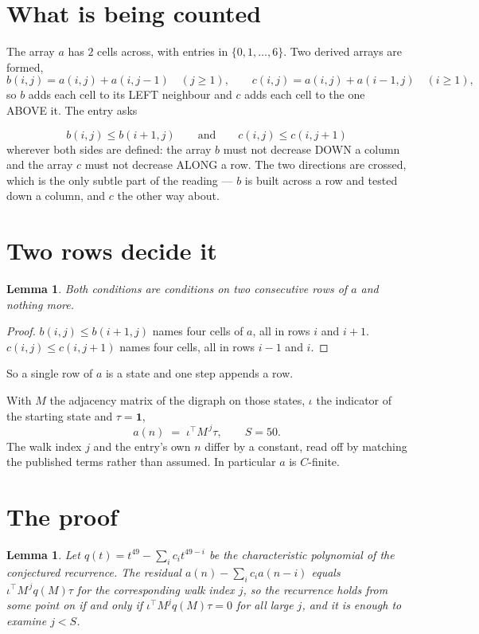 \documentclass[11pt,a4paper]{article}
\theoremstyle{plain}
\newtheorem{lemma}[theorem]{Lemma}
\theoremstyle{definition}
\begin{document}
\section{What is being counted}

The array $a$ has $2$ cells across, with entries in $\{0,1,\dots,6\}$. Two derived arrays are formed,
\[
b(i,j)=a(i,j)+a(i,j-1)\quad(j\ge1),\qquad c(i,j)=a(i,j)+a(i-1,j)\quad(i\ge1),
\]
so $b$ adds each cell to its LEFT neighbour and $c$ adds each cell to the one ABOVE it. The
entry asks

\[
b(i,j)\le b(i{+}1,j)\qquad\text{and}\qquad c(i,j)\le c(i,j{+}1)
\]
wherever both sides are defined: the array $b$ must not decrease DOWN a column and the array
$c$ must not decrease ALONG a row. The two directions are crossed, which is the only subtle
part of the reading --- $b$ is built across a row and tested down a column, and $c$ the other
way about.


\section{Two rows decide it}

\begin{lemma}\label{lem:win}
Both conditions are conditions on two consecutive rows of $a$ and nothing more.
\end{lemma}

\begin{proof}
$b(i,j)\le b(i{+}1,j)$ names four cells of $a$, all in rows $i$ and $i+1$. $c(i,j)\le
c(i,j{+}1)$ names four cells, all in rows $i-1$ and $i$.
\end{proof}

So a single row of $a$ is a state and one step appends a row.

With $M$ the adjacency matrix of the digraph on those states, $\iota$ the indicator of the
starting state and $\tau=\mathbf{1}$,
\[
a(n)\;=\;\iota^{\!\top}M^{\,j}\tau ,\qquad S=50.
\]
The walk index $j$ and the entry's own $n$ differ by a constant, read off by matching the
published terms rather than assumed. In particular $a$ is $C$-finite.

\section{The proof}

\begin{lemma}\label{lem:crit}
Let $q(t)=t^{49}-\sum_i c_it^{49-i}$ be the characteristic polynomial of the
conjectured recurrence. The residual $a(n)-\sum_ic_ia(n-i)$ equals
$\iota^{\!\top}M^{\,j}q(M)\tau$ for the corresponding walk index $j$, so the recurrence
holds from some point on if and only if $\iota^{\!\top}M^{j}q(M)\tau=0$ for all large $j$,
and it is enough to examine $j<S$.
\end{lemma}
\end{document}
